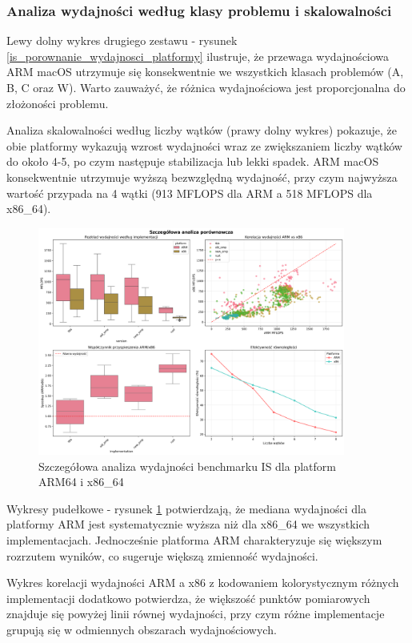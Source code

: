 \subsubsection{Analiza wydajności według klasy problemu i skalowalności}
Lewy dolny wykres drugiego zestawu - rysunek \ref{is_porownanie_wydajnosci_platformy} ilustruje, że przewaga wydajnościowa ARM macOS utrzymuje się konsekwentnie we wszystkich klasach problemów (A, B, C oraz W). Warto zauważyć, że różnica wydajnościowa jest proporcjonalna do złożoności problemu.

Analiza skalowalności według liczby wątków (prawy dolny wykres) pokazuje, że obie platformy wykazują wzrost wydajności wraz ze zwiększaniem liczby wątków do około 4-5, po czym następuje stabilizacja lub lekki spadek. ARM macOS konsekwentnie utrzymuje wyższą bezwzględną wydajność, przy czym najwyższa wartość przypada na 4 wątki (913 MFLOPS dla ARM a 518 MFLOPS dla x86\_64).

\begin{figure}[H]
    \centering
    \includegraphics[width=0.9\textwidth]{analiza/images/parallel/is/compare/is_szczegolowa_analiza_wydajnosci.png}
    \caption{Szczegółowa analiza wydajności benchmarku IS dla platform ARM64 i x86\_64}
    \label{is_szczegolowa_analiza_wydajnosci}
\end{figure}
Wykresy pudełkowe - rysunek \ref{is_szczegolowa_analiza_wydajnosci} potwierdzają, że mediana wydajności dla platformy ARM jest systematycznie wyższa niż dla x86\_64 we wszystkich implementacjach. Jednocześnie platforma ARM charakteryzuje się większym rozrzutem wyników, co sugeruje większą zmienność wydajności.

Wykres korelacji wydajności ARM a x86 z kodowaniem kolorystycznym różnych implementacji dodatkowo potwierdza, że większość punktów pomiarowych znajduje się powyżej linii równej wydajności, przy czym różne implementacje grupują się w odmiennych obszarach wydajnościowych.

